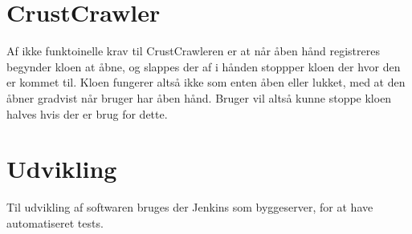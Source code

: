 \section{CrustCrawler}
Af ikke funktoinelle krav til CrustCrawleren er at når åben hånd registreres begynder kloen at åbne, og slappes der af i hånden stoppper kloen der hvor den er kommet til. Kloen fungerer altså ikke som enten åben eller lukket, med at den åbner gradvist når bruger har åben hånd. Bruger vil altså kunne stoppe kloen halves hvis der er brug for dette.

\section{Udvikling}
Til udvikling af softwaren bruges der Jenkins som byggeserver, for at have automatiseret tests.